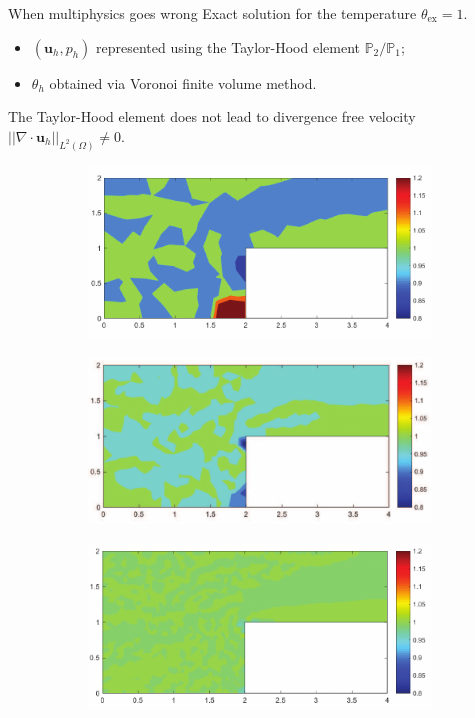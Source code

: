 \documentclass[aspectratio=169]{beamer}
\begin{document}
\begin{frame}{When multiphysics goes wrong}
	Exact solution for the temperature $\theta_{\mathrm{ex}}= 1$.
	\begin{itemize}
		\item $(\bm{u}_h, p_h)$ represented using the Taylor-Hood element $\mathbb{P}_2/\mathbb{P}_1$;
		\item $\theta_h$ obtained via Voronoi finite volume method.
	\end{itemize}
The Taylor-Hood element does not lead to divergence free velocity $||\nabla \cdot \bm{u}_h||_{L^2(\Omega)} \neq 0$.
\begin{figure}[t]
	\begin{subfigure}[t]{0.32\textwidth}
		\includegraphics[width=\columnwidth]{Concentration_ref1.png}\\
	\end{subfigure}\hfill
	\begin{subfigure}[t]{0.32\textwidth}
		\includegraphics[width=\columnwidth]{Concentration_ref2.png}\\
	\end{subfigure}\hfill
	\begin{subfigure}[t]{0.32\textwidth}
		\includegraphics[width=\columnwidth]{Concentration_ref3.png}\\

\end{subfigure}
\end{figure}
\end{frame}
\end{document}
